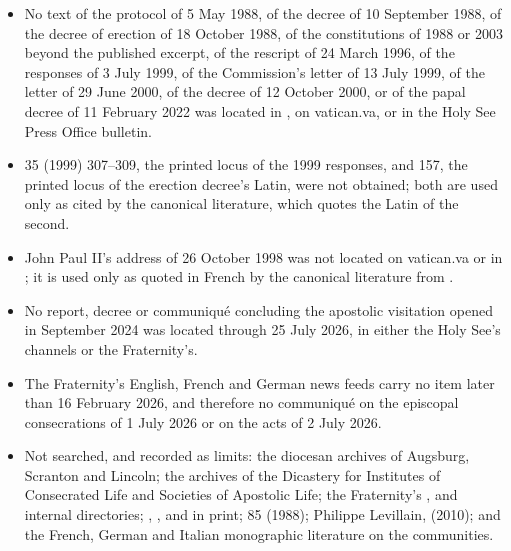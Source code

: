 \begin{itemize}
\item No text of the protocol of 5 May 1988, of the decree of 10
September 1988, of the decree of erection of 18 October 1988, of the
constitutions of 1988 or 2003 beyond the published excerpt, of the
rescript of 24 March 1996, of the responses of 3 July 1999, of the
Commission's letter of 13 July 1999, of the letter of 29 June 2000, of the
decree of 12 October 2000, or of the papal decree of 11 February 2022 was
located in , on vatican.va, or in the Holy
See Press Office bulletin.
\item {} 35 (1999) 307--309, the printed locus of the 1999
responses, and  157, the
printed locus of the erection decree's Latin, were not obtained; both are
used only as cited by the canonical literature, which quotes the Latin of
the second.
\item John Paul II's address of 26 October 1998 was not located on
vatican.va or in ; it is used only as quoted
in French by the canonical literature from .
\item No report, decree or communiqué concluding the apostolic visitation
opened in September 2024 was located through 25 July 2026, in either the
Holy See's channels or the Fraternity's.
\item The Fraternity's English, French and German news feeds carry no
item later than 16 February 2026, and therefore no communiqué on the
episcopal consecrations of 1 July 2026 or on the acts of 2 July 2026.
\item Not searched, and recorded as limits: the diocesan archives of
Augsburg, Scranton and Lincoln; the archives of the Dicastery for
Institutes of Consecrated Life and Societies of Apostolic Life; the
Fraternity's ,  and internal
directories; , ,
 and  in
print;  85 (1988); Philippe Levillain,
 (2010); and the French, German and
Italian monographic literature on the  communities.
\end{itemize}
